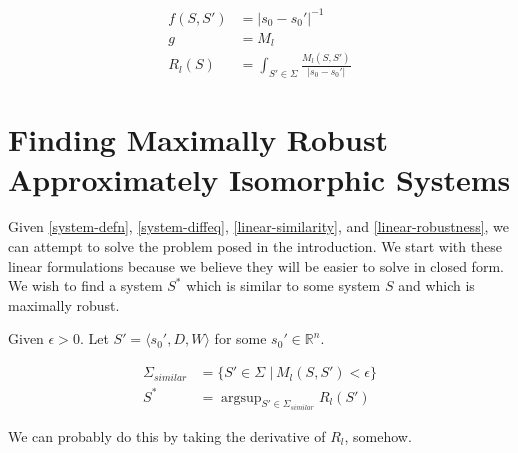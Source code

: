 \documentclass{article}
\DeclareMathOperator*{\argsup}{argsup}
\begin{document}
\begin{align}
  f(S, S') &= \lvert s_0 - s_0' \rvert^{-1} \\
  g &= M_l \\
  R_l(S) &= \int_{S' \in \Sigma} \frac{M_l(S, S')}{\lvert s_0 - s_0' \rvert} \label{linear-robustness}
\end{align}

\section{Finding Maximally Robust Approximately Isomorphic Systems} \label{max-robust}
Given \eqref{system-defn}, \eqref{system-diffeq}, \eqref{linear-similarity}, and \eqref{linear-robustness}, we can attempt to solve the problem posed in the introduction. We start with these linear formulations because we believe they will be easier to solve in closed form. We wish to find a system $S^*$ which is similar to some system $S$ and which is maximally robust.

Given $\epsilon > 0$. Let $S' = \langle s_0', D, W \rangle$ for some $s_0' \in \mathbb{R}^n$.

\begin{align}
  \Sigma_{similar} &= \{S' \in \Sigma \,\,|\, M_l(S, S') < \epsilon \} \\
  S^* &= \argsup_{S' \in \Sigma_{similar}} R_l(S')
\end{align}

We can probably do this by taking the derivative of $R_l$, somehow.
\end{document}
